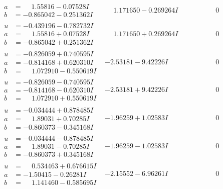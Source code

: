 \documentclass[1p]{elsarticle_modified}
\theoremstyle{definition}
\begin{document}
$$\begin{array}{c|c|c}
\begin{aligned}
a &= \phantom{-}1.55816 - 0.07528 I \\
b &= -0.865042 - 0.251362 I\end{aligned}
 & \phantom{-}1.171650 - 0.269264 I & \phantom{-0.000000 } 0 \\ \hline\begin{aligned}
u &= -0.439196 - 0.782732 I \\
a &= \phantom{-}1.55816 + 0.07528 I \\
b &= -0.865042 + 0.251362 I\end{aligned}
 & \phantom{-}1.171650 + 0.269264 I & \phantom{-0.000000 } 0 \\ \hline\begin{aligned}
u &= -0.826059 + 0.740595 I \\
a &= -0.814168 + 0.620310 I \\
b &= \phantom{-}1.072910 - 0.550619 I\end{aligned}
 & -2.53181 - 9.42226 I & \phantom{-0.000000 } 0 \\ \hline\begin{aligned}
u &= -0.826059 - 0.740595 I \\
a &= -0.814168 - 0.620310 I \\
b &= \phantom{-}1.072910 + 0.550619 I\end{aligned}
 & -2.53181 + 9.42226 I & \phantom{-0.000000 } 0 \\ \hline\begin{aligned}
u &= -0.034444 + 0.878485 I \\
a &= \phantom{-}1.89031 + 0.70285 I \\
b &= -0.860373 - 0.345168 I\end{aligned}
 & -1.96259 + 1.02583 I & \phantom{-0.000000 } 0 \\ \hline\begin{aligned}
u &= -0.034444 - 0.878485 I \\
a &= \phantom{-}1.89031 - 0.70285 I \\
b &= -0.860373 + 0.345168 I\end{aligned}
 & -1.96259 - 1.02583 I & \phantom{-0.000000 } 0 \\ \hline\begin{aligned}
u &= \phantom{-}0.534463 + 0.676615 I \\
a &= -1.50415 - 0.26281 I \\
b &= \phantom{-}1.141460 - 0.585695 I\end{aligned}
 & -2.15552 - 6.96261 I & \phantom{-0.000000 } 0 \\ \hline\begin{aligned}

\end{aligned}
\end{array}$$
\end{document}
